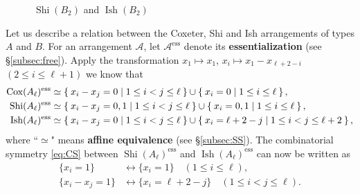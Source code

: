 \documentclass[11pt]{article}
\theoremstyle{definition}
\numberwithin{equation}{section}
\DeclareMathOperator{\Cox}{Cox}
\DeclareMathOperator{\Shi}{Shi}
\DeclareMathOperator{\Ish}{Ish}
\newcommand{\A}{\mathcal{A}}
\newcommand{\tbf}{\textbf}
\begin{document}
  \begin{figure}[htbp!]
\centering
\begin{subfigure}{.5\textwidth}
  \centering
{}
 \end{subfigure}%
\begin{subfigure}{.5\textwidth}
  \centering
{}
 \end{subfigure}%
\caption{$\Shi(B_2)$ and $\Ish(B_2)$}
\label{fig:Shi Ish B2}
\end{figure}



Let us describe a relation between the Coxeter, Shi and Ish arrangements of types $A$ and $B$. 
For an arrangement $\A$, let $ \mathcal{A}^{\mathrm{ess}} $  denote its \textbf{essentialization} (see \S\ref{subsec:free}). 
Apply the transformation $x_1 \mapsto x_1$, $x_i \mapsto x_1-x_{\ell+2-i}$ $(2 \le i \le \ell +1)$ we know that
\begin{align*}
\Cox(A_{\ell})^{\mathrm{ess}} &\simeq \Set{x_{i}-x_{j} = 0 | 1 \leq i < j \leq \ell} \cup \Set{x_{i} = 0 | 1 \leq i \leq \ell}, \\
\Shi(A_{\ell})^{\mathrm{ess}} &\simeq \Set{x_{i}-x_{j} = 0,1 | 1 \leq i < j \leq \ell} \cup \Set{x_{i} = 0,1 | 1 \leq i \leq \ell}, \\
\Ish(A_{\ell})^{\mathrm{ess}} &\simeq \Set{x_{i}-x_{j} = 0 | 1 \leq i < j \leq \ell} \cup \Set{x_{i} = \ell+2-j | 1 \leq i < j \leq \ell+2},
\end{align*}
where ``$\simeq$" means \tbf{affine equivalence} (see \S\ref{subsec:SS}). 
The combinatorial symmetry \eqref{eq:CS} between $\Shi(A_{\ell})^{\mathrm{ess}}$ and $\Ish(A_{\ell})^{\mathrm{ess}}$ can now be written as
\begin{equation}
\label{eq:RCS}
\begin{aligned}
\{x_{i} = 1\} &\longleftrightarrow \{x_{i} = 1\} \quad (1 \leq i \leq \ell), \\
\{x_{i}-x_{j}= 1\} &\longleftrightarrow \{ x_{i} = \ell+2-j\}  \quad (1 \leq i < j \leq \ell). 
\end{aligned}
\end{equation}
\end{document}
